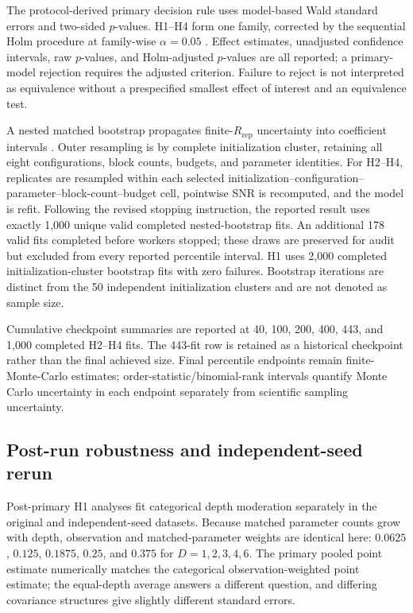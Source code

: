 \documentclass[pdflatex,sn-mathphys-num,Numbered]{sn-jnl}
\begin{document}
The protocol-derived primary decision rule uses model-based Wald standard errors and two-sided $p$-values. H1--H4 form one family, corrected by the sequential Holm procedure at family-wise $\alpha=0.05$ \cite{holm1979sequential}. Effect estimates, unadjusted confidence intervals, raw $p$-values, and Holm-adjusted $p$-values are all reported; a primary-model rejection requires the adjusted criterion. Failure to reject is not interpreted as equivalence without a prespecified smallest effect of interest and an equivalence test.

A nested matched bootstrap propagates finite-$R_{\mathrm{rep}}$ uncertainty into coefficient intervals \cite{davison1997bootstrap}. Outer resampling is by complete initialization cluster, retaining all eight configurations, block counts, budgets, and parameter identities. For H2--H4, replicates are resampled within each selected initialization--configuration--parameter--block-count--budget cell, pointwise SNR is recomputed, and the model is refit. Following the revised stopping instruction, the reported result uses exactly 1,000 unique valid completed nested-bootstrap fits. An additional 178 valid fits completed before workers stopped; these draws are preserved for audit but excluded from every reported percentile interval. H1 uses 2,000 completed initialization-cluster bootstrap fits with zero failures. Bootstrap iterations are distinct from the 50 independent initialization clusters and are not denoted as sample size.

Cumulative checkpoint summaries are reported at 40, 100, 200, 400, 443, and 1,000 completed H2--H4 fits. The 443-fit row is retained as a historical checkpoint rather than the final achieved size. Final percentile endpoints remain finite-Monte-Carlo estimates; order-statistic/binomial-rank intervals quantify Monte Carlo uncertainty in each endpoint separately from scientific sampling uncertainty.


\subsection{Post-run robustness and independent-seed rerun}\label{sec:h2-depth-methods}

Post-primary H1 analyses fit categorical depth moderation separately in the original and independent-seed datasets. Because matched parameter counts grow with depth, observation and matched-parameter weights are identical here: $0.0625$, $0.125$, $0.1875$, $0.25$, and $0.375$ for $D=1,2,3,4,6$. The primary pooled point estimate numerically matches the categorical observation-weighted point estimate; the equal-depth average answers a different question, and differing covariance structures give slightly different standard errors.
\end{document}
